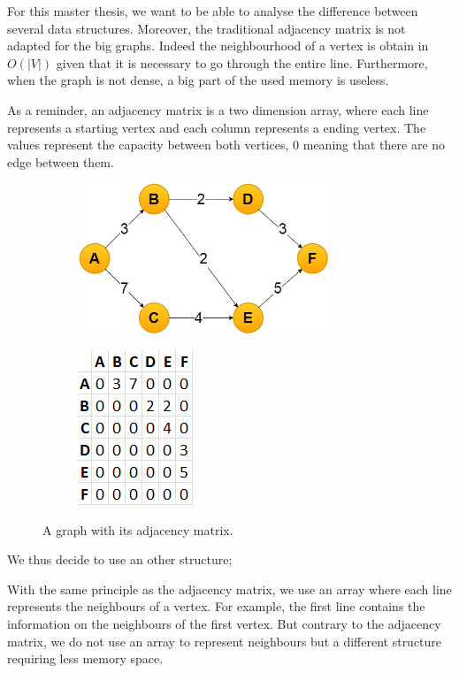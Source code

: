 For this master thesis, we want to be able to analyse the difference between several data structures. Moreover, the traditional adjacency matrix is not adapted for the big graphs. Indeed the neighbourhood of a vertex is obtain in $O(|V|)$ given that it is necessary to go through the entire line. Furthermore, when the graph is not dense, a big part of the used memory is useless.

As a reminder, an adjacency matrix is a two dimension array, where each line represents a starting vertex and each column represents a ending vertex. The values represent the capacity between both vertices, 0 meaning that there are no edge between them. \newline

\begin{figure}[!h]
\begin{subfigure}{.6\textwidth}
\includegraphics[width=7.5cm,height=4.5cm]{images/graph.png}
\end{subfigure}
\begin{subfigure}{.4\textwidth}
\includegraphics[scale=0.7]{images/adjacencyMatrix.png}
\end{subfigure}
\caption{A graph with its adjacency matrix.}
\end{figure}

We thus decide to use an other structure; \newline

With the same principle as the adjacency matrix, we use an array where each line represents the neighbours of a vertex. For example, the first line contains the information on the neighbours of the first vertex. But contrary to the adjacency matrix, we do not use an array to represent neighbours but a different structure requiring less memory space. \newline

